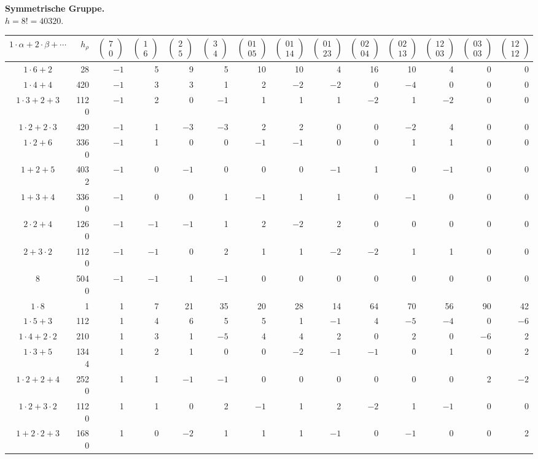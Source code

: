 \documentclass[11pt]{article}
\newcommand{\ch}[2]{\left(\begin{smallmatrix}#1\\#2\end{smallmatrix}\right)}
\begin{document}
\begin{landscape}
\begin{center}
\small
\textbf{Symmetrische Gruppe.}\\
$h=8!=40320.$\\[0.5em]
\setlength{\tabcolsep}{3.5pt}
\renewcommand{\arraystretch}{1.15}
\begin{tabular}{c r|rrrrrrrrrrrr}
\toprule
$1\cdot\alpha+2\cdot\beta+\cdots$ & $h_\rho$ & $\ch{7}{0}$ & $\ch{1}{6}$ & $\ch{2}{5}$ & $\ch{3}{4}$ & $\ch{01}{05}$ & $\ch{01}{14}$ & $\ch{01}{23}$ & $\ch{02}{04}$ & $\ch{02}{13}$ & $\ch{12}{03}$ & $\ch{03}{03}$ & $\ch{12}{12}$\\
\midrule
$1\cdot6+2$ & 28 & $-1$ & 5 & 9 & 5 & 10 & 10 & 4 & 16 & 10 & 4 & 0 & 0\\
$1\cdot4+4$ & 420 & $-1$ & 3 & 3 & 1 & 2 & $-2$ & $-2$ & 0 & $-4$ & 0 & 0 & 0\\
$1\cdot3+2+3$ & 1120 & $-1$ & 2 & 0 & $-1$ & 1 & 1 & 1 & $-2$ & 1 & $-2$ & 0 & 0\\
$1\cdot2+2\cdot3$ & 420 & $-1$ & 1 & $-3$ & $-3$ & 2 & 2 & 0 & 0 & $-2$ & 4 & 0 & 0\\
$1\cdot2+6$ & 3360 & $-1$ & 1 & 0 & 0 & $-1$ & $-1$ & 0 & 0 & 1 & 1 & 0 & 0\\
$1+2+5$ & 4032 & $-1$ & 0 & $-1$ & 0 & 0 & 0 & $-1$ & 1 & 0 & $-1$ & 0 & 0\\
$1+3+4$ & 3360 & $-1$ & 0 & 0 & 1 & $-1$ & 1 & 1 & 0 & $-1$ & 0 & 0 & 0\\
$2\cdot2+4$ & 1260 & $-1$ & $-1$ & $-1$ & 1 & 2 & $-2$ & 2 & 0 & 0 & 0 & 0 & 0\\
$2+3\cdot2$ & 1120 & $-1$ & $-1$ & 0 & 2 & 1 & 1 & $-2$ & $-2$ & 1 & 1 & 0 & 0\\
$8$ & 5040 & $-1$ & $-1$ & 1 & $-1$ & 0 & 0 & 0 & 0 & 0 & 0 & 0 & 0\\
\midrule
$1\cdot8$ & 1 & 1 & 7 & 21 & 35 & 20 & 28 & 14 & 64 & 70 & 56 & 90 & 42\\
$1\cdot5+3$ & 112 & 1 & 4 & 6 & 5 & 5 & 1 & $-1$ & 4 & $-5$ & $-4$ & 0 & $-6$\\
$1\cdot4+2\cdot2$ & 210 & 1 & 3 & 1 & $-5$ & 4 & 4 & 2 & 0 & 2 & 0 & $-6$ & 2\\
$1\cdot3+5$ & 1344 & 1 & 2 & 1 & 0 & 0 & $-2$ & $-1$ & $-1$ & 0 & 1 & 0 & 2\\
$1\cdot2+2+4$ & 2520 & 1 & 1 & $-1$ & $-1$ & 0 & 0 & 0 & 0 & 0 & 0 & 2 & $-2$\\
$1\cdot2+3\cdot2$ & 1120 & 1 & 1 & 0 & 2 & $-1$ & 1 & 2 & $-2$ & 1 & $-1$ & 0 & 0\\
$1+2\cdot2+3$ & 1680 & 1 & 0 & $-2$ & 1 & 1 & 1 & $-1$ & 0 & $-1$ & 0 & 0 & 2\\

\end{tabular}
\end{center}
\end{landscape}
\end{document}
